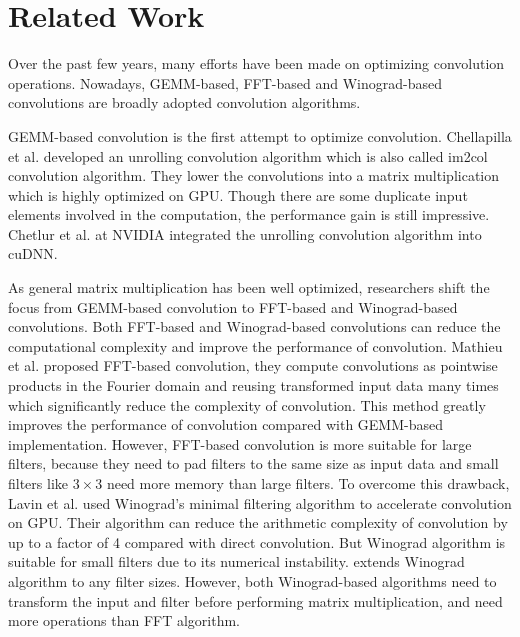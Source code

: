 \section{Related Work}
Over the past few years, many efforts have been made on optimizing convolution operations. Nowadays, GEMM-based, FFT-based and
Winograd-based convolutions are broadly adopted convolution algorithms.

GEMM-based convolution is the first attempt to optimize convolution. Chellapilla et al. \cite{Chellapilla2006High} developed an unrolling
convolution algorithm which is also called im2col convolution algorithm. They lower the convolutions into a matrix multiplication which is
highly optimized on GPU. Though there are some duplicate input elements involved in the computation, the performance gain is still
impressive. Chetlur et al. \cite{ChetlurWVCTCS14} at NVIDIA integrated the unrolling convolution algorithm into cuDNN.

As general matrix multiplication has been well optimized, researchers shift the focus from GEMM-based convolution to FFT-based and
Winograd-based convolutions. Both FFT-based and Winograd-based convolutions can reduce the computational complexity and improve the
performance of convolution. Mathieu et al. \cite{mathieu2013fast} proposed FFT-based convolution, they compute convolutions as pointwise
products in the Fourier domain and reusing transformed input data many times which significantly reduce the complexity of convolution. This
method greatly improves the performance of convolution compared with GEMM-based implementation. However, FFT-based convolution is more
suitable for large filters, because they need to pad filters to the same size as input data and small filters like $3 \times 3$ need more
memory than large filters. To overcome this drawback, Lavin et al. \cite{lavin2016fast} used Winograd’s minimal filtering algorithm to
accelerate convolution on GPU. Their algorithm can reduce the arithmetic complexity of convolution by up to a factor of 4 compared with
direct convolution. But Winograd algorithm is suitable for small filters due to its numerical instability. \cite{Zhen2018Optimizing}
extends Winograd algorithm to any filter sizes. However, both Winograd-based algorithms need to transform the input and filter before
performing matrix multiplication, and need more operations than FFT algorithm.

